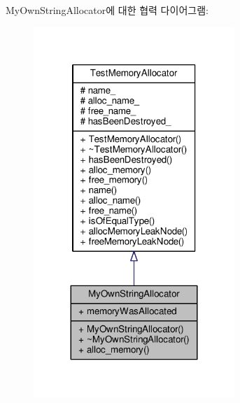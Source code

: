My\+Own\+String\+Allocator에 대한 협력 다이어그램\+:
\nopagebreak
\begin{figure}[H]
\begin{center}
\leavevmode
\includegraphics[width=215pt]{class_my_own_string_allocator__coll__graph}
\end{center}
\end{figure}
